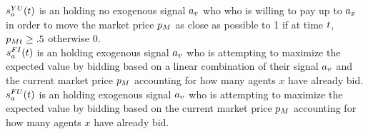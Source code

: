 $s^{YU}_a(t)$ is an  holding no exogenous signal $a_v$ who who is willing to pay up to $a_x$ in order to move the market price $p_M$ as close as possible to 1 if at time $t$, $p_{Mt} \ge .5$ otherwise 0. \\

$s^{FI}_a(t)$ is an holding exogenous signal $a_v$ who is attempting to maximize the expected value by bidding based on a linear combination of their signal $a_v$ and the current market price $p_M$ accounting for how many agents $x$ have already bid. \\

$s^{FU}_a(t)$ is an  holding exogenous signal $a_v$ who is attempting to maximize the expected value by bidding based on the current market price $p_M$ accounting for how many agents $x$ have already bid. \\
